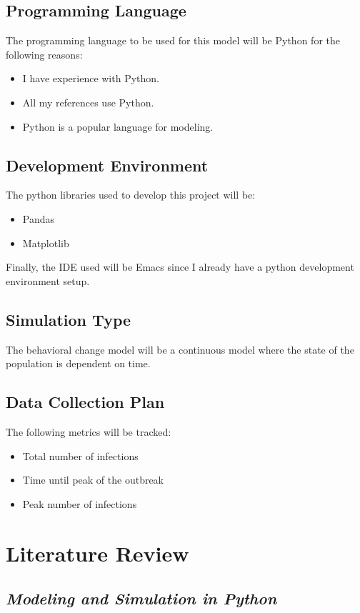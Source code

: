 \documentclass{article}
\begin{document}
\subsection{Programming Language}
The programming language to be used for this model will be Python for the following reasons:
\begin{itemize}
\item I have experience with Python.
\item All my references use Python.
\item Python is a popular language for modeling.
\end{itemize}

\subsection{Development Environment}
The python libraries used to develop this project will be:
\begin{itemize}
\item Pandas 
\item Matplotlib
\end{itemize}
Finally, the IDE used will be Emacs since I already have a python development environment setup.

\subsection{Simulation Type}
The behavioral change model will be a continuous model where the state of the population is dependent on time.

\subsection{Data Collection Plan}
The following metrics will be tracked:
\begin{itemize}
  \item Total number of infections
  \item Time until peak of the outbreak
  \item Peak number of infections
\end{itemize}


\section{Literature Review}
\subsection{\textit{Modeling and Simulation in Python}}
\end{document}
